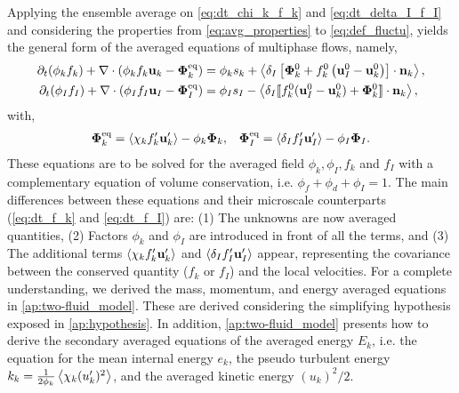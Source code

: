 Applying the ensemble average on \ref{eq:dt_chi_k_f_k} and \ref{eq:dt_delta_I_f_I} and considering the properties from \ref{eq:avg_properties} to \ref{eq:def_fluctu}, yields the general form of the averaged equations of multiphase flows, namely,
\begin{align}
    \partial_t (\phi_k f_k)
    +\mathbf{\nabla}\cdot (\phi_k f_k \textbf{u}_k - \mathbf{\Phi}_k^\text{eq})
    &= 
    \phi_k s_k
    + \left<\delta_I\left[
        \mathbf{\Phi}_k^0
        + f_k^0
        \left(
            \textbf{u}_I^0
            - \textbf{u}_k^0
        \right)
    \right]
    \cdot \textbf{n}_k\right> ,
    \label{eq:avg_dt_chi_f}\\
    \partial_t (\phi_I f_I)
    +\mathbf{\nabla}\cdot (\phi_I f_I \textbf{u}_I- \mathbf{\Phi}_{I}^\text{eq})
    &= 
    \phi_I s_I
    - \left<\delta_I 
    \llbracket 
    f_k^0 (\textbf{u}_I^0 - \textbf{u}_k^0)
    + \mathbf{\Phi}_k^0
     \rrbracket \cdot \textbf{n}_k 
     \right>,
    \label{eq:avg_dt_delta_f}
\end{align}
with, 
\begin{align*}
    \mathbf{\Phi}_k^\text{eq}
    = \left<\chi_k f_k' \textbf{u}_k'\right>
    - \phi_k \bm\Phi_k,
    &&
    \mathbf{\Phi}_{I}^\text{eq}
    = \left<\delta_I f_I' \textbf{u}_I'\right>
    - \phi_I \bm\Phi_I. 
\end{align*}
These equations are to be solved for the averaged field $\phi_k,\phi_I,f_k$ and $f_I$ with a complementary equation of volume conservation, i.e. $\phi_f+\phi_d+\phi_I = 1$.
The main differences between these equations and their microscale counterparts (\ref{eq:dt_f_k} and \ref{eq:dt_f_I}) are:
(1) The unknowns are now averaged quantities,
(2) Factors $\phi_k$ and $\phi_I$ are introduced in front of all the terms, and
(3) The additional terms $\left<\chi_k f_k' \textbf{u}_k'\right>$ and $\left<\delta_I f_I' \textbf{u}_I'\right>$ appear, representing the covariance between the conserved quantity ($f_k$ or $f_I$) and the local velocities.  
For a complete understanding, we derived the mass, momentum, and energy averaged equations in \ref{ap:two-fluid_model}. 
These are derived considering the simplifying hypothesis exposed in \ref{ap:hypothesis}. 
In addition, \ref{ap:two-fluid_model} presents how to derive the secondary averaged equations of the averaged energy $E_k$, i.e. the equation for the mean internal energy $e_k$, the pseudo turbulent energy $k_k = \frac{1}{2\phi_k}\left<\chi_k (u'_k)^2\right>$, and the averaged kinetic energy $(u_k)^2/2$.  


